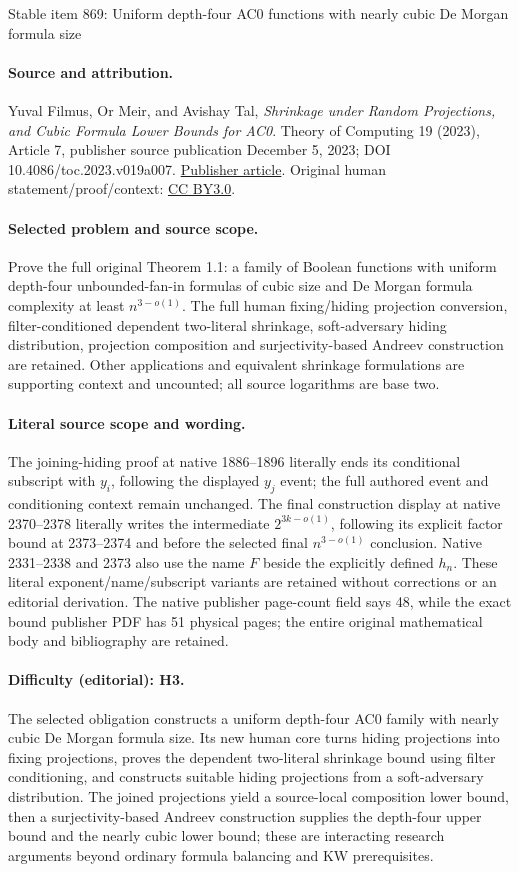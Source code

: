 \documentclass[11pt]{article}
\numberwithin{equation}{section}
\theoremstyle{definition}
\theoremstyle{plain}
\theoremstyle{definition}\newtheorem{notation}[theorem]{Notation}\theoremstyle{plain}
\theoremstyle{definition}
\theoremstyle{plain}
\begin{document}
\begin{center}{\Large Stable item 869: Uniform depth-four AC0 functions with nearly cubic De Morgan formula size}\end{center}
\paragraph{Source and attribution.}
Yuval Filmus, Or Meir, and Avishay Tal, \emph{Shrinkage under Random Projections, and Cubic Formula Lower Bounds for AC0}. Theory of Computing 19 (2023), Article 7, publisher source publication December 5, 2023; DOI 10.4086/toc.2023.v019a007. \href{https://theoryofcomputing.org/articles/v019a007/}{Publisher article}. Original human statement/proof/context: \href{https://creativecommons.org/licenses/by/3.0/}{CC BY3.0}.
\paragraph{Selected problem and source scope.}
Prove the full original Theorem 1.1: a family of Boolean functions with uniform depth-four unbounded-fan-in formulas of cubic size and De Morgan formula complexity at least \(n^{3-o(1)}\). The full human fixing/hiding projection conversion, filter-conditioned dependent two-literal shrinkage, soft-adversary hiding distribution, projection composition and surjectivity-based Andreev construction are retained. Other applications and equivalent shrinkage formulations are supporting context and uncounted; all source logarithms are base two.
\paragraph{Literal source scope and wording.}
The joining-hiding proof at native 1886–1896 literally ends its conditional subscript with \(y_i\), following the displayed \(y_j\) event; the full authored event and conditioning context remain unchanged. The final construction display at native 2370–2378 literally writes the intermediate \(2^{3k-o(1)}\), following its explicit factor bound at 2373–2374 and before the selected final \(n^{3-o(1)}\) conclusion. Native 2331–2338 and 2373 also use the name \(F\) beside the explicitly defined \(h_n\). These literal exponent/name/subscript variants are retained without corrections or an editorial derivation. The native publisher page-count field says 48, while the exact bound publisher PDF has 51 physical pages; the entire original mathematical body and bibliography are retained.
\paragraph{Difficulty (editorial): H3.}
The selected obligation constructs a uniform depth-four AC0 family with nearly cubic De Morgan formula size. Its new human core turns hiding projections into fixing projections, proves the dependent two-literal shrinkage bound using filter conditioning, and constructs suitable hiding projections from a soft-adversary distribution. The joined projections yield a source-local composition lower bound, then a surjectivity-based Andreev construction supplies the depth-four upper bound and the nearly cubic lower bound; these are interacting research arguments beyond ordinary formula balancing and KW prerequisites.
\end{document}
